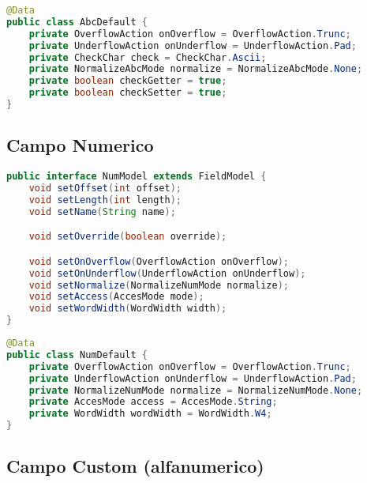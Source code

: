 \documentclass[a4paper,10pt]{report}
\begin{document}
\begin{lstlisting}[language=java, caption=class AbcDefault, 
label=code:AbcDefault]
@Data
public class AbcDefault {
    private OverflowAction onOverflow = OverflowAction.Trunc;
    private UnderflowAction onUnderflow = UnderflowAction.Pad;
    private CheckChar check = CheckChar.Ascii;
    private NormalizeAbcMode normalize = NormalizeAbcMode.None;
    private boolean checkGetter = true;
    private boolean checkSetter = true;
}
\end{lstlisting}


\subsection{Campo Numerico}

\begin{lstlisting}[language=java, caption=interfaccia NumModel, 
label=code:NumModel]
public interface NumModel extends FieldModel {
    void setOffset(int offset);
    void setLength(int length);
    void setName(String name);

    void setOverride(boolean override);

    void setOnOverflow(OverflowAction onOverflow);
    void setOnUnderflow(UnderflowAction onUnderflow);
    void setNormalize(NormalizeNumMode normalize);
    void setAccess(AccesMode mode);
    void setWordWidth(WordWidth width);
}
\end{lstlisting}

\begin{lstlisting}[language=java, caption=class NumDefault, 
label=code:NumDefault]
@Data
public class NumDefault {
    private OverflowAction onOverflow = OverflowAction.Trunc;
    private UnderflowAction onUnderflow = UnderflowAction.Pad;
    private NormalizeNumMode normalize = NormalizeNumMode.None;
    private AccesMode access = AccesMode.String;
    private WordWidth wordWidth = WordWidth.W4;
}
\end{lstlisting}


\subsection{Campo Custom (alfanumerico)}
\end{document}
